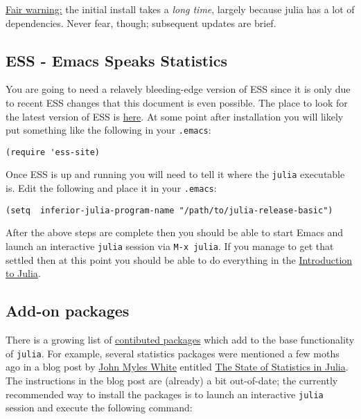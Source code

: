 \documentclass[11pt]{article}
\begin{document}
\underline{Fair warning:} the initial install takes a \emph{long time}, largely
because julia has a lot of dependencies. Never fear, though;
subsequent updates are brief.
\subsection[ESS - Emacs Speaks Statistics]{ESS - Emacs Speaks Statistics}
\label{sec-1-2}

You are going to need a relavely bleeding-edge version of ESS since it
is only due to recent ESS changes that this document is even possible.
The place to look for the latest version of ESS is \href{http://stat.ethz.ch/ESS/index.php?Section=download}{here}.  At some
point after installation you will likely put something like the
following in your \texttt{.emacs}:

\begin{verbatim}
(require 'ess-site)
\end{verbatim}

Once ESS is up and running you will need to tell it where the \texttt{julia}
executable is. Edit the following and place it in your \texttt{.emacs}:

\begin{verbatim}
(setq  inferior-julia-program-name "/path/to/julia-release-basic")
\end{verbatim}

After the above steps are complete then you should be able to start
Emacs and launch an interactive \texttt{julia} session via \texttt{M-x julia}.  If
you manage to get that settled then at this point you should be able
to do everything in the \href{file://intro-julia.org}{Introduction to Julia}.
\subsection[Add-on packages]{Add-on packages}
\label{sec-1-3}

There is a growing list of \href{http://docs.julialang.org/en/release-0.1/packages/packagelist/}{contibuted packages} which add to the base
functionality of \texttt{julia}.  For example, several statistics packages
were mentioned a few moths ago in a blog post by \href{https://github.com/johnmyleswhite}{John Myles White}
entitled \href{http://www.johnmyleswhite.com/notebook/2012/12/02/the-state-of-statistics-in-julia/}{The State of Statistics in Julia}.  The instructions in the
blog post are (already) a bit out-of-date; the currently recommended
way to install the packages is to launch an interactive \texttt{julia}
session and execute the following command:
\end{document}

